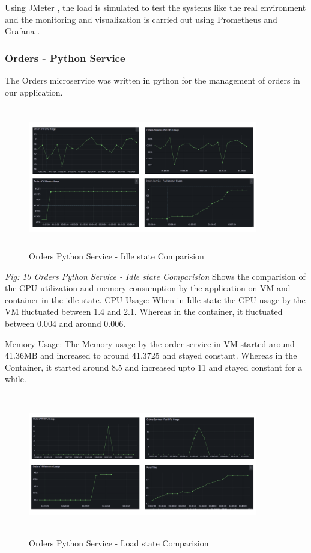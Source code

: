 Using JMeter , the load is simulated to test the systems like the real environment and the monitoring and visualization is carried out using Prometheus and Grafana .

\subsubsection{ Orders - Python Service}
The Orders microservice was written in python for the management of orders in our application. 

\begin{figure}[!h]
    \centering
    \includegraphics[width=10cm, height=6.2cm]{images/orders-cpu-idle-comp.png}
    \caption{Orders Python Service - Idle state Comparision}
\end{figure}

 \emph{Fig: 10 Orders Python Service - Idle state Comparision} Shows the comparision of the CPU utilization and memory consumption by the application on VM and container in the idle state.
CPU Usage: When in Idle state the CPU usage by the VM fluctuated between 1.4 and 2.1. Whereas in the container, it fluctuated between 0.004 and around 0.006.

Memory Usage:  The Memory usage by the order service in VM started around 41.36MB and increased to around 41.3725 and stayed constant. Whereas in the Container, it started around 8.5 and increased upto 11 and stayed constant for a while.

\begin{figure}[!h]
    \centering
    \includegraphics[width=10cm, height=6.2cm]{images/orders-cpu-load-comp.png}
    \caption{Orders Python Service - Load state Comparision}
\end{figure}

